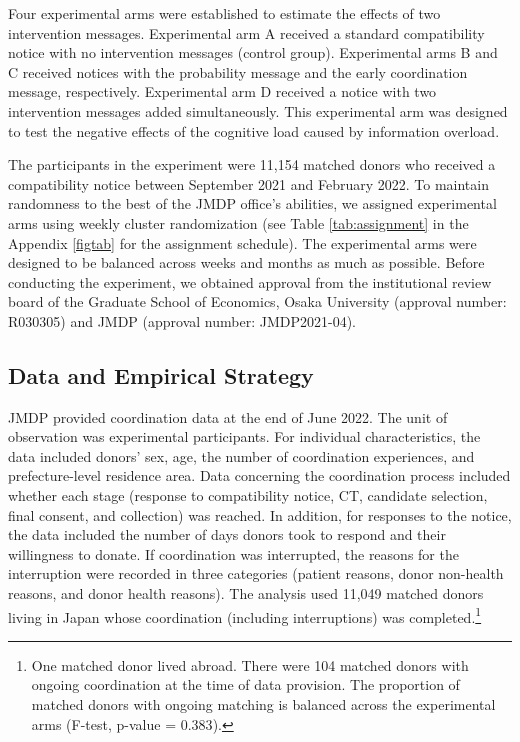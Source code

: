 \documentclass[12pt, a4paper]{article}
\begin{document}
Four experimental arms were established to estimate the effects of two intervention messages. Experimental arm A received a standard compatibility notice with no intervention messages (control group). Experimental arms B and C received notices with the probability message and the early coordination message, respectively. Experimental arm D received a notice with two intervention messages added simultaneously. This experimental arm was designed to test the negative effects of the cognitive load caused by information overload.

The participants in the experiment were 11,154 matched donors who received a compatibility notice between September 2021 and February 2022. To maintain randomness to the best of the JMDP office's abilities, we assigned experimental arms using weekly cluster randomization (see Table \ref{tab:assignment} in the Appendix \ref{figtab} for the assignment schedule). The experimental arms were designed to be balanced across weeks and months as much as possible. Before conducting the experiment, we obtained approval from the institutional review board of the Graduate School of Economics, Osaka University (approval number: R030305) and JMDP (approval number: JMDP2021-04).

\hypertarget{data-and-empirical-strategy}{%
\subsection{Data and Empirical Strategy}\label{data-and-empirical-strategy}}

JMDP provided coordination data at the end of June 2022. The unit of observation was experimental participants. For individual characteristics, the data included donors' sex, age, the number of coordination experiences, and prefecture-level residence area. Data concerning the coordination process included whether each stage (response to compatibility notice, CT, candidate selection, final consent, and collection) was reached. In addition, for responses to the notice, the data included the number of days donors took to respond and their willingness to donate. If coordination was interrupted, the reasons for the interruption were recorded in three categories (patient reasons, donor non-health reasons, and donor health reasons). The analysis used 11,049 matched donors living in Japan whose coordination (including interruptions) was completed.\footnote{One matched donor lived abroad. There were 104 matched donors with ongoing coordination at the time of data provision. The proportion of matched donors with ongoing matching is balanced across the experimental arms (F-test, p-value = \(0.383\)).}
\end{document}
